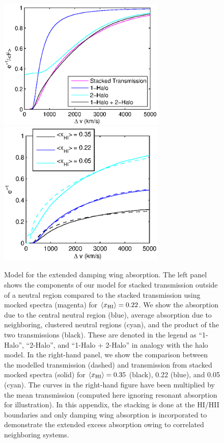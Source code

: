 \begin{figure}[h]
  \centering
	\includegraphics[width=8cm]{fig13a.eps}
	\includegraphics[width=8cm]{fig13b.eps}
  \caption{Model for the extended damping wing absorption. The left panel shows the components of our model for stacked transmission outside of a neutral region compared to the stacked transmission using mocked spectra (magenta) for $\langle x_{\text{HI}}\rangle = 0.22$. We show the absorption due to the central neutral region (blue), average absorption due to neighboring, clustered neutral regions (cyan), and the product of the two transmissions (black). These are denoted in the legend as ``1-Halo'', ``2-Halo'', and ``1-Halo + 2-Halo'' in analogy with the halo model. In the right-hand panel, we show the comparison between the modelled transmission (dashed) and transmission from stacked mocked spectra (solid) for $\langle x_{\text{HI}}\rangle = 0.35$ (black), 0.22 (blue), and 0.05 (cyan). The curves in the right-hand figure have been multiplied by the mean transmission (computed here ignoring resonant absorption for illustration).  In this appendix, the stacking is done at the HI/HII boundaries and only damping wing absorption is incorporated to demonstrate the extended excess absorption owing to correlated neighboring systems.}
  \label{fig:HaloParts}
\end{figure}
